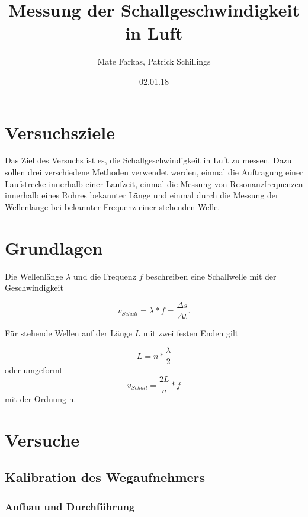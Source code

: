 \documentclass[]{article}
\title{Messung der Schallgeschwindigkeit in Luft}
\date{02.01.18}
\author{Mate Farkas, Patrick Schillings}
\begin{document}
	
	
	\tableofcontents
	
	\noindent\makebox[\linewidth]{\rule{\textwidth}{0.4pt}}
	
	\section{Versuchsziele}
	
	Das Ziel des Versuchs ist es, die Schallgeschwindigkeit in Luft zu messen. Dazu sollen drei verschiedene Methoden verwendet werden, einmal die Auftragung einer Laufstrecke innerhalb einer Laufzeit, einmal die Messung von Resonanzfrequenzen innerhalb eines Rohres bekannter Länge und einmal durch die Messung der Wellenlänge bei bekannter Frequenz einer stehenden Welle.
	
	\section{Grundlagen} %
	
	Die Wellenlänge $\lambda$ und die Frequenz $f$ beschreiben eine Schallwelle mit der Geschwindigkeit
	
	\begin{equation}
		v_{Schall}=\lambda*f=\frac{\Delta s}{\Delta t}.
		\label{e1}
	\end{equation}
	
	Für stehende Wellen auf der Länge $L$ mit zwei festen Enden gilt
	
	\begin{equation}
		L=n*\frac{\lambda}{2}
		\label{e2}
	\end{equation}
	oder umgeformt
	\begin{equation}
	v_{Schall}=\frac{2L}{n}*f
	\label{e3} 
	\end{equation}	
	mit der Ordnung n.
	
	
	\section{Versuche}
	
	\subsection{Kalibration des Wegaufnehmers}
	\subsubsection{Aufbau und Durchführung}
\end{document}
